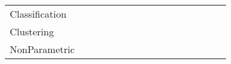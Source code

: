 \begin{tabular}{llllllllllllllll}
Classification       &                  &                    &                     &                    &                      &                   &                         &             &                   &                    &                 &                           &                       &                         &                     \\
Clustering           &                  &                    &                     &                    &                      &                   &                         &             &                   &                    &                 &                           &                       &                         &                     \\
NonParametric        &                  &                    &                     &                    &                      &                   &                         &             &                   &                    &                 &                           &                       &                         &                     \\
\bottomrule
\end{tabular}
